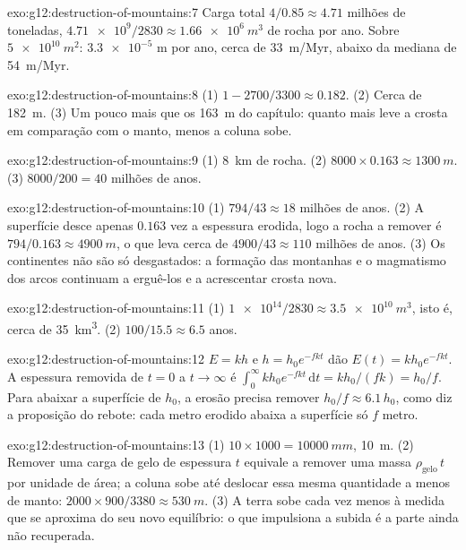 \begin{solution}{exo:g12:destruction-of-mountains:7}
Carga total $4/0.85 \approx 4.71$ milhões de toneladas, $\num{4.71e9}/2830 \approx
\qty{1.66e6}{m^3}$ de rocha por ano. Sobre $\qty{5e10}{m^2}$: $\num{3.3e-5}$ m
por ano, cerca de \qty{33}{m/Myr}, abaixo da mediana de \qty{54}{m/Myr}.
\end{solution}

\begin{solution}{exo:g12:destruction-of-mountains:8}
(1) $1 - 2700/3300 \approx 0.182$. (2) Cerca de \qty{182}{m}. (3) Um pouco
mais que os \qty{163}{m} do capítulo: quanto mais leve a crosta em
comparação com o manto, menos a coluna sobe.
\end{solution}

\begin{solution}{exo:g12:destruction-of-mountains:9}
(1) \qty{8}{km} de rocha. (2) $8000 \times 0.163 \approx \qty{1300}{m}$.
(3) $8000/200 = 40$ milhões de anos.
\end{solution}

\begin{solution}{exo:g12:destruction-of-mountains:10}
(1) $794/43 \approx 18$ milhões de anos. (2) A superfície desce apenas
$0.163$ vez a espessura erodida, logo a rocha a remover é $794/0.163
\approx \qty{4900}{m}$, o que leva cerca de $4900/43 \approx 110$ milhões de
anos. (3) Os continentes não são só desgastados: a formação das montanhas e
o magmatismo dos arcos continuam a erguê-los e a acrescentar crosta nova.
\end{solution}

\begin{solution}{exo:g12:destruction-of-mountains:11}
(1) $\num{1e14}/2830 \approx \qty{3.5e10}{m^3}$, isto é, cerca de
\qty{35}{km^3}. (2) $100/15.5 \approx 6.5$ anos.
\end{solution}

\begin{solution}{exo:g12:destruction-of-mountains:12}
$E = kh$ e $h = h_0 e^{-fkt}$ dão $E(t) = kh_0 e^{-fkt}$. A espessura
removida de $t = 0$ a $t \to \infty$ é $\int_0^{\infty} kh_0
e^{-fkt}\,\mathrm{d}t = kh_0/(fk) = h_0/f$. Para abaixar a superfície de
$h_0$, a erosão precisa remover $h_0/f \approx 6.1\,h_0$, como diz a
proposição do rebote: cada metro erodido abaixa a superfície só $f$ metro.
\end{solution}

\begin{solution}{exo:g12:destruction-of-mountains:13}
(1) $10 \times 1000 = \qty{10000}{mm}$, \qty{10}{m}. (2) Remover uma carga
de gelo de espessura $t$ equivale a remover uma massa $\rho_{\text{gelo}}\,t$
por unidade de área; a coluna sobe até deslocar essa mesma quantidade a
menos de manto:
$2000 \times 900/3380 \approx \qty{530}{m}$. (3) A terra sobe cada vez menos
à medida que se aproxima do seu novo equilíbrio: o que impulsiona a subida é
a parte ainda não recuperada.
\end{solution}

